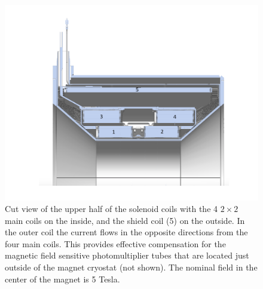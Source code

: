 \documentclass[final,3p,twocolumn]{elsarticle}
\begin{document}
\begin{figure}[htbp!]
\centerline{\includegraphics[width=1.3\columnwidth]{Solenoid.pdf}}
\caption{\footnotesize Cut view of the upper half of the solenoid coils with the 4 $2 \times 2$ main coils on the inside, 
and the shield coil (5) on the outside. 
In the outer coil the current flows in the opposite directions from the four main coils. This provides effective compensation 
for the magnetic field sensitive photomultiplier tubes that are located just outside of the magnet cryostat (not shown).  
The nominal field in the center of the magnet is 5 Tesla. }
\label{solenoid-coils}
\end{figure}
\end{document}
